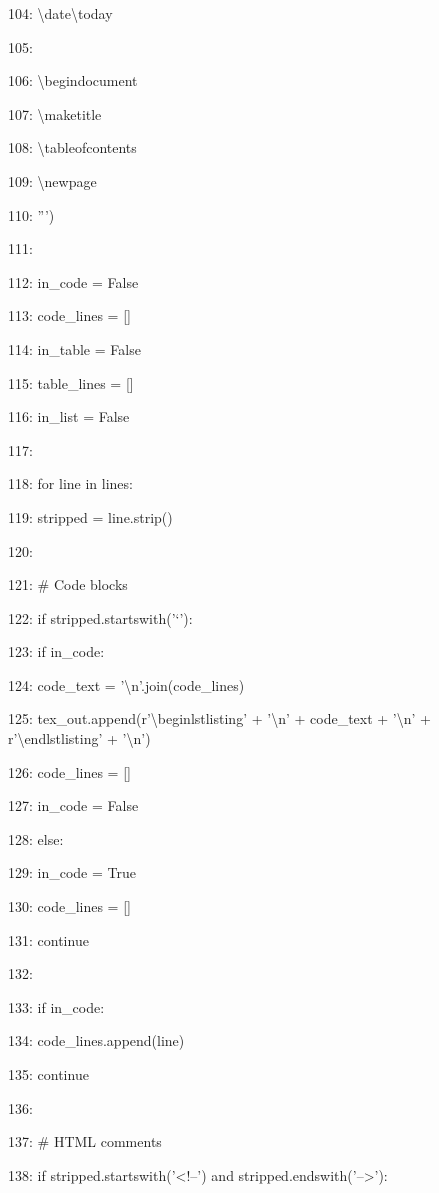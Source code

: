 \documentclass[11pt,a4paper]{article}
\begin{document}
104: \textbackslash{}date{\textbackslash{}today}

105:

106: \textbackslash{}begin{document}

107: \textbackslash{}maketitle

108: \textbackslash{}tableofcontents

109: \textbackslash{}newpage

110: ''')

111:

112:     in\_code = False

113:     code\_lines = []

114:     in\_table = False

115:     table\_lines = []

116:     in\_list = False

117:

118:     for line in lines:

119:         stripped = line.strip()

120:

121:         \# Code blocks

122:         if stripped.startswith('\texttt{}`'):

123:             if in\_code:

124:                 code\_text = '\textbackslash{}n'.join(code\_lines)

125:                 tex\_out.append(r'\textbackslash{}begin{lstlisting}' + '\textbackslash{}n' + code\_text + '\textbackslash{}n' + r'\textbackslash{}end{lstlisting}' + '\textbackslash{}n')

126:                 code\_lines = []

127:                 in\_code = False

128:             else:

129:                 in\_code = True

130:                 code\_lines = []

131:             continue

132:

133:         if in\_code:

134:             code\_lines.append(line)

135:             continue

136:

137:         \# HTML comments

138:         if stripped.startswith('<!--') and stripped.endswith('-->'):
\end{document}
